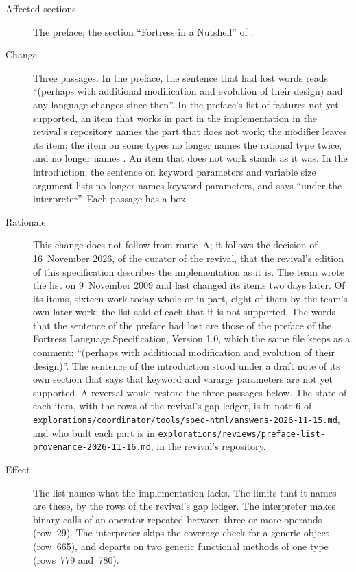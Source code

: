 \begin{description}
\item[Affected sections] The preface; the section ``Fortress in a Nutshell''
of .
\item[Change] Three passages.
In the preface, the sentence that had lost words reads ``(perhaps with
additional modification and evolution of their design) and any language
changes since then''.
In the preface's list of features not yet supported, an item that works in
part in the implementation in the revival's repository names the part that
does not work; the modifier  leaves its item; the item on some
types no longer names the rational type twice, and no longer names
.
An item that does not work stands as it was.
In the introduction, the sentence on keyword parameters and variable size
argument lists no longer names keyword parameters, and says ``under the
interpreter''.
Each passage has a box.
\item[Rationale] This change does not follow from route~A; it follows the
decision of 16~November 2026, of the curator of the revival, that the
revival's edition of this specification describes the implementation as it is.
The team wrote the list on 9~November 2009 and last changed its items two days
later.
Of its items, sixteen work today whole or in part, eight of them by the team's
own later work; the list said of each that it is not supported.
The words that the sentence of the preface had lost are those of the preface
of the Fortress Language Specification, Version 1.0, which the same file keeps
as a comment: ``(perhaps with additional modification and evolution of their
design)''.
The sentence of the introduction stood under a draft note of its own section
that says that keyword and varargs parameters are not yet supported.
A reversal would restore the three passages below.
The state of each item, with the rows of the revival's gap ledger, is in note
6 of
\nolinkurl{explorations/coordinator/tools/spec-html/answers-2026-11-15.md},
and who built each part is in
\nolinkurl{explorations/reviews/preface-list-provenance-2026-11-16.md}, in the
revival's repository.
\item[Effect] The list names what the implementation lacks.
The limits that it names are these, by the rows of the revival's gap ledger.
The interpreter makes binary calls of an operator repeated between three or
more operands (row~29).
The interpreter skips the coverage check for a generic object (row~665), and
departs on two generic functional methods of one type (rows~779 and~780).

\end{description}
